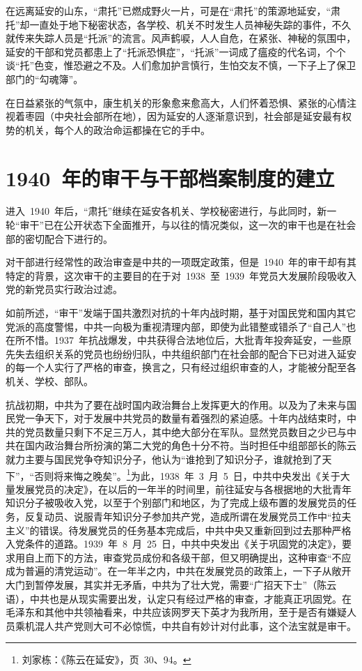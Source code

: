 在远离延安的山东，“肃托”已燃成野火一片，可是在“肃托”的策源地延安，“肃托”却一直处于地下秘密状态，各学校、机关不时发生人员神秘失踪的事件，不久就传来失踪人员是“托派”的流言。风声鹤唳，人人自危，在紧张、神秘的氛围中，延安的干部和党员都患上了“托派恐惧症”，“托派”一词成了瘟疫的代名词，个个谈“托”色变，惟恐避之不及。人们愈加护言慎行，生怕交友不慎，一下子上了保卫部门的“勾魂簿”。

在日益紧张的气氛中，康生机关的形象愈来愈高大，人们怀着恐惧、紧张的心情注视着枣园（中央社会部所在地），因为延安的人逐渐意识到，社会部是延安最有权势的机关，每个人的政治命运都操在它的手中。

\section{1940~年的审干与干部档案制度的建立}

进入~1940~年后，“肃托”继续在延安各机关、学校秘密进行，与此同时，新一轮“审干”已在公开状态下全面推开，与以往的情况类似，这一次的审干也是在社会部的密切配合下进行的。

对干部进行经常性的政治审查是中共的一项既定政策，但是~1940~年的审干却有其特定的背景，这次审干的主要目的在于对~1938~至~1939~年党员大发展阶段吸收入党的新党员实行政治过滤。

如前所述，“审干”发端于国共激烈对抗的十年内战时期，基于对国民党和国内其它党派的高度警惕，中共一向极为重视清理内部，即使为此错整或错杀了“自己人”也在所不惜。1937~年抗战爆发，中共获得合法地位后，大批青年投奔延安，一些原先失去组织关系的党员也纷纷归队，中共组织部门在社会部的配合下已对进入延安的每一个人实行了严格的审查，换言之，只有经过组织审查的人，才能被分配至各机关、学校、部队。

抗战初期，中共为了要在战时国内政治舞台上发挥更大的作用。以及为了未来与国民党一争天下，对于发展中共党员的数量有着强烈的紧迫感。十年内战结束时，中共的党员数量只剩下不足三万人，其中绝大部分在军队。显然党员数目之少已与中共在国内政治舞台所扮演的第二大党的角色十分不符。当时担任中组部部长的陈云就力主要与国民党争夺知识分子，他认为“谁抢到了知识分子，谁就抢到了天下”，“否则将来悔之晚矣”。\footnote{刘家栋：《陈云在延安》，页~30、94。}为此，1938~年~3~月~5~日，中共中央发出《关于大量发展党员的决定》，在以后的一年半的时间里，前往延安与各根据地的大批青年知识分子被吸收入党，以至于个别部门和地区，为了完成上级布置的发展党员的任务，反复动员、说服青年知识分子参加共产党，造成所谓在发展党员工作中“拉夫主义”的错误。待发展党员的任务基本完成后，中共中央又重新回到过去那种严格入党条件的道路。1939~年~8~月~25~日，中共中央发出《关于巩固党的决定》，要求用自上而下的方法，审查党员成份和各级干部，但又明确提出，这种审查“不应成为普遍的清党运动”。在一年半之内，中共在发展党员的政策上，一下子从敞开大门到暂停发展，其实并无矛盾，中共为了壮大党，需要“广招天下士”（陈云语），中共也是从现实需要出发，认定只有经过严格的审查，才能真正巩固党。在毛泽东和其他中共领袖看来，中共应该网罗天下英才为我所用，至于是否有嫌疑人员乘机混人共产党则大可不必惊慌，中共自有妙计对付此事，这个法宝就是审干。

